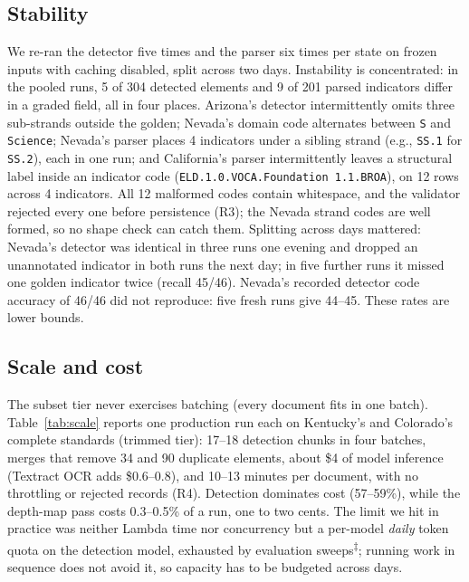 \documentclass[letterpaper]{article} %
\newcommand{\elog}{\textsuperscript{$\ddagger$}}
\begin{document}
\subsection{Stability}
\label{sec:eval-stability}

We re-ran the detector five times and the parser six times per state on
frozen inputs with caching disabled, split across two days. Instability is
concentrated: in the pooled runs, 5 of 304 detected elements and 9 of 201
parsed indicators differ in a graded field, all in four places. Arizona's
detector intermittently omits three sub-strands outside the golden; Nevada's
domain code alternates between \texttt{S} and \texttt{Science}; Nevada's parser
places 4 indicators under a sibling strand (e.g., \texttt{SS.1} for
\texttt{SS.2}), each in one run; and California's parser intermittently leaves
a structural label inside an indicator code
(\texttt{ELD.1.0.VOCA.Foundation 1.1.BROA}), on 12 rows across 4 indicators.
All 12 malformed codes contain whitespace, and the validator rejected every one
before persistence (R3); the Nevada strand codes are well formed, so no shape
check can catch them. Splitting across days mattered: Nevada's detector was
identical in three runs one evening and dropped an unannotated indicator in
both runs the next day; in five further runs it missed one golden indicator
twice (recall 45/46). Nevada's recorded detector code accuracy of 46/46 did not
reproduce: five fresh runs give 44--45. These rates are lower bounds.

\subsection{Scale and cost}
\label{sec:eval-scale}



The subset tier never exercises batching (every document fits in one batch).
Table~\ref{tab:scale} reports one production run each on Kentucky's and
Colorado's complete standards (trimmed tier): 17--18 detection chunks in four
batches, merges that remove 34 and 90 duplicate elements, about \$4 of model
inference (Textract OCR adds \$0.6--0.8), and 10--13 minutes per document, with
no throttling or rejected records (R4). Detection dominates cost (57--59\%),
while the depth-map pass costs 0.3--0.5\% of a run, one to two cents. The limit we
hit in practice was neither Lambda time nor concurrency but a per-model
\emph{daily} token quota on the detection model, exhausted by evaluation
sweeps\elog; running work in sequence does not avoid it, so capacity has to be
budgeted across days.
\end{document}
